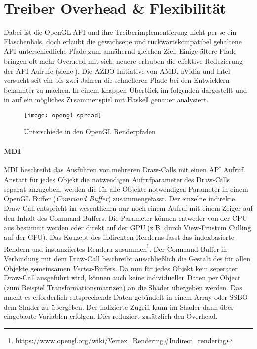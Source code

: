 \section{Treiber Overhead \& Flexibilität}
\label{sec:overhead-und-flexibilitaet}

Dabei ist die OpenGL API und ihre Treiberimplementierung nicht per se ein Flaschenhals, doch erlaubt die gewachsene und rückwärtskompatibel gehaltene API unterschiedliche Pfade zum annähernd gleichen Ziel. Einige ältere Pfade bringen oft mehr Overhead mit sich, neuere erlauben die effektive Reduzierung der API Aufrufe (siehe ).  Die \ac{AZDO} Initiative von AMD, nVidia und Intel versucht seit ein bis zwei Jahren die schnelleren Pfade bei den Entwicklern bekannter zu machen. In einem knappen Überblick im folgenden dargestellt und in  auf ein mögliches Zusammenspiel mit Haskell genauer analysiert.

\begin{figure}
	\texttt{[image: opengl-spread]}
	\caption[Unterschiede in den OpenGL Renderpfaden]{Unterschiede in den OpenGL Renderpfaden \parencite[Seite 98]{Everitt2014}}
	\label{fig:opengl-pfade}
\end{figure}

\paragraph{\acl{MDI}} 
\ac{MDI} beschreibt das Ausführen von mehreren Draw-Calls mit einen API Aufruf. Anstatt für jedes Objekt die notwendigen Aufrufparameter des Draw-Calls separat anzugeben, werden die für alle Objekte notwendigen Parameter in einem OpenGL Buffer (\textit{Command Buffer}) zusammengefasst. Der einzelne indirekte Draw-Call entspricht im wesentlichen nur noch einem Aufruf mit einem Zeiger auf den Inhalt des Command Buffers. Die Parameter können entweder von der CPU aus bestimmt werden oder direkt auf der GPU (z.B. durch View-Frustum Culling auf der GPU). Das Konzept des indirekten Renderns fasst das indexbasierte Rendern und instanziiertes Rendern zusammen\footnote{https://www.opengl.org/wiki/Vertex\_Rendering\#Indirect\_rendering}. Der Command-Buffer in Verbindung mit dem Draw-Call beschreibt ausschließlich die Gestalt des für allen Objekte gemeinsamen \textit{Vertex}-Buffers. Da nun für jedes Objekt kein seperater Draw-Call ausgeführt wird, können auch keine individuellen Daten per Object (zum Beispiel Transformationsmatrizen) an die Shader übergeben werden. Das macht es erforderlich entsprechende Daten gebündelt in einem Array oder \ac{SSBO} dem Shader zu übergeben. Der indizierte Zugriff kann im Shader dann über eingebaute Variablen erfolgen. Dies reduziert zusätzlich den Overhead.

